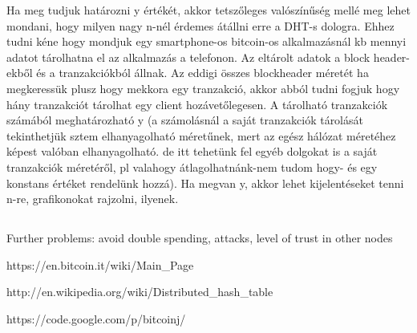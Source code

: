 \documentclass[a4paper,12pt]{article}
\begin{document}
Ha meg tudjuk határozni y értékét, akkor tetszőleges valószínűség mellé meg lehet mondani, hogy milyen nagy n-nél érdemes átállni erre a DHT-s dologra. Ehhez tudni kéne hogy mondjuk egy smartphone-os bitcoin-os alkalmazásnál kb mennyi adatot tárolhatna el az alkalmazás a telefonon. Az eltárolt adatok a block header-ekből és a tranzakciókból állnak. Az eddigi összes blockheader méretét ha megkeressük plusz hogy mekkora egy tranzakció, akkor abból tudni fogjuk hogy hány tranzakciót tárolhat egy client hozávetőlegesen. A tárolható tranzakciók számából meghatározható y (a számolásnál a saját tranzakciók tárolását tekinthetjük sztem elhanyagolható méretűnek, mert az egész hálózat méretéhez képest valóban elhanyagolható. de itt tehetünk fel egyéb dolgokat is a saját tranzakciók méretéről, pl valahogy átlagolhatnánk-nem tudom hogy- és egy konstans értéket rendelünk hozzá). Ha megvan y, akkor lehet kijelentéseket tenni n-re, grafikonokat rajzolni, ilyenek.

\subsection{}
Further problems: avoid double spending, attacks, level of trust in other nodes


\newpage
\begin{thebibliography}{9}
\bibitem{}
https://en.bitcoin.it/wiki/Main\_Page
\label{bitcoinwiki}

\bibitem{}
http://en.wikipedia.org/wiki/Distributed\_hash\_table
\label{dhtwiki}

\bibitem{}
https://code.google.com/p/bitcoinj/
\label{bitcoinj}

\end{thebibliography}
\end{document}
